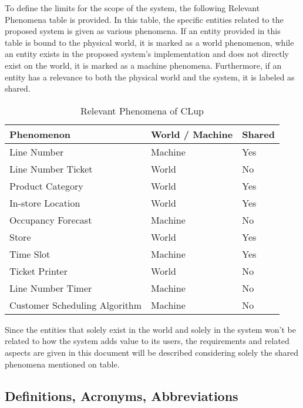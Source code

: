 To define the limits for the scope of the system, the following Relevant Phenomena table is provided.
In this table, the specific entities related to the proposed system is given as various phenomena.
If an entity provided in this table is bound to the physical world, it is marked as a world phenomenon, while an entity exists in the proposed system's implementation and does not directly exist on the world, it is marked as a machine phenomena.
Furthermore, if an entity has a relevance to both the physical world and the system, it is labeled as shared.
\begin{table}[H]
    \begin{tabular}{|p{4cm}|p{4cm}|p{4cm}|}
        \hline
        \textbf{Phenomenon}    & \textbf{World / Machine}       & \textbf{Shared } \\ \hline
        Line Number & Machine & Yes \\ \hline
        Line Number Ticket & World & No \\ \hline
        Product Category & World & Yes \\ \hline
        In-store Location & World & Yes \\ \hline
        Occupancy Forecast & Machine & No \\ \hline
        Store & World & Yes \\ \hline
        Time Slot & Machine & Yes \\ \hline
        Ticket Printer & World & No \\ \hline
        Line Number Timer & Machine & No \\ \hline
        Customer Scheduling Algorithm & Machine & No \\ \hline

    \end{tabular}
    \caption{Relevant Phenomena of CLup}
    \label{tab:Phenomenon}
\end{table}

Since the entities that solely exist in the world and solely in the system won't be related to how the system adds value to its users, the requirements and related aspects are given in this document will be described considering solely the shared phenomena mentioned on  table.



\subsection{Definitions, Acronyms, Abbreviations}
